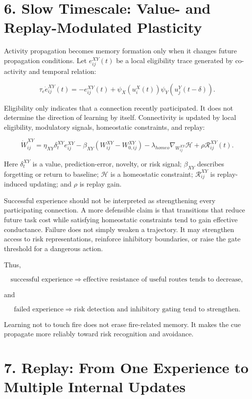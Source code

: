 \documentclass[11pt, a4paper]{article}
\begin{document}
\section{6. Slow Timescale: Value- and Replay-Modulated Plasticity}

Activity propagation becomes memory formation only when it changes future propagation conditions. Let $e_{ij}^{XY}(t)$ be a local eligibility trace generated by co-activity and temporal relation:

\[
\tau_e\dot e_{ij}^{XY}(t)=-e_{ij}^{XY}(t)+\psi_X(u_i^X(t))\psi_Y(u_j^Y(t-\delta)).
\]

Eligibility only indicates that a connection recently participated. It does not determine the direction of learning by itself. Connectivity is updated by local eligibility, modulatory signals, homeostatic constraints, and replay:

\[
\dot W_{ij}^{XY}
=\eta_{XY}\delta_t^{XY}e_{ij}^{XY}
-\beta_{XY}\left(W_{ij}^{XY}-W_{0,ij}^{XY}\right)
-\lambda_{homeo}\nabla_{W_{ij}^{XY}}\mathcal{H}
+\rho\mathcal{R}_{ij}^{XY}(t).
\]

Here $\delta_t^{XY}$ is a value, prediction-error, novelty, or risk signal; $\beta_{XY}$ describes forgetting or return to baseline; $\mathcal{H}$ is a homeostatic constraint; $\mathcal{R}_{ij}^{XY}$ is replay-induced updating; and $\rho$ is replay gain.

Successful experience should not be interpreted as strengthening every participating connection. A more defensible claim is that transitions that reduce future task cost while satisfying homeostatic constraints tend to gain effective conductance. Failure does not simply weaken a trajectory. It may strengthen access to risk representations, reinforce inhibitory boundaries, or raise the gate threshold for a dangerous action.

Thus,

\[
\text{successful experience}\Rightarrow\text{effective resistance of useful routes tends to decrease},
\]

and

\[
\text{failed experience}\Rightarrow\text{risk detection and inhibitory gating tend to strengthen}.
\]

Learning not to touch fire does not erase fire-related memory. It makes the cue propagate more reliably toward risk recognition and avoidance.


\section{7. Replay: From One Experience to Multiple Internal Updates}
\end{document}

